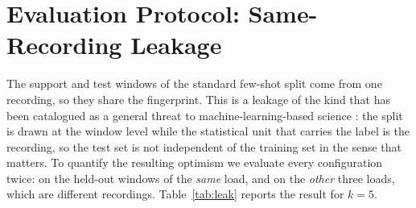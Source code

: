 \documentclass[journal]{IEEEtran}
\begin{document}
\section{Evaluation Protocol: Same-Recording Leakage}
\label{sec:protocol}

The support and test windows of the standard few-shot split come from one
recording, so they share the fingerprint. This is a leakage of the kind that
has been catalogued as a general threat to machine-learning-based science
\cite{kapoor2023leakage}: the split is drawn at the window level while the
statistical unit that carries the label is the recording, so the test set is
not independent of the training set in the sense that matters. To quantify the
resulting optimism we
evaluate every configuration twice: on the held-out windows of the
\emph{same} load, and on the \emph{other} three loads, which are different
recordings. Table~\ref{tab:leak} reports the result for $k=5$.
\end{document}
